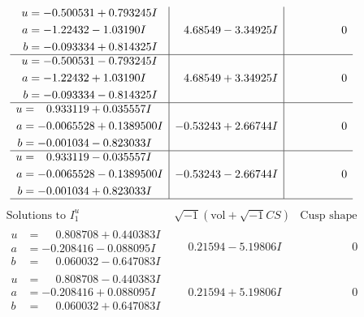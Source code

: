 \documentclass[1p]{elsarticle_modified}
\theoremstyle{definition}
\newcommand{\I}{\sqrt{-1}}
\begin{document}
$$\begin{array}{c|c|c}
\begin{aligned}
u &= -0.500531 + 0.793245 I \\
a &= -1.22432 - 1.03190 I \\
b &= -0.093334 + 0.814325 I\end{aligned}
 & \phantom{-}4.68549 - 3.34925 I & \phantom{-0.000000 } 0 \\ \hline\begin{aligned}
u &= -0.500531 - 0.793245 I \\
a &= -1.22432 + 1.03190 I \\
b &= -0.093334 - 0.814325 I\end{aligned}
 & \phantom{-}4.68549 + 3.34925 I & \phantom{-0.000000 } 0 \\ \hline\begin{aligned}
u &= \phantom{-}0.933119 + 0.035557 I \\
a &= -0.0065528 + 0.1389500 I \\
b &= -0.001034 - 0.823033 I\end{aligned}
 & -0.53243 + 2.66744 I & \phantom{-0.000000 } 0 \\ \hline\begin{aligned}
u &= \phantom{-}0.933119 - 0.035557 I \\
a &= -0.0065528 - 0.1389500 I \\
b &= -0.001034 + 0.823033 I\end{aligned}
 & -0.53243 - 2.66744 I & \phantom{-0.000000 } 0\\
 \hline 
 \end{array}$$\newpage$$\begin{array}{c|c|c}  
\text{Solutions to }I^u_{1}& \I (\text{vol} + \sqrt{-1}CS) & \text{Cusp shape}\\
 \hline 
\begin{aligned}
u &= \phantom{-}0.808708 + 0.440383 I \\
a &= -0.208416 - 0.088095 I \\
b &= \phantom{-}0.060032 - 0.647083 I\end{aligned}
 & \phantom{-}0.21594 - 5.19806 I & \phantom{-0.000000 } 0 \\ \hline\begin{aligned}
u &= \phantom{-}0.808708 - 0.440383 I \\
a &= -0.208416 + 0.088095 I \\
b &= \phantom{-}0.060032 + 0.647083 I\end{aligned}
 & \phantom{-}0.21594 + 5.19806 I & \phantom{-0.000000 } 0 \\ \hline\begin{aligned}

\end{aligned}
\end{array}$$
\end{document}
